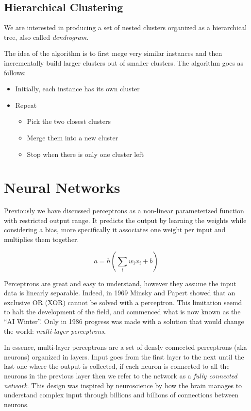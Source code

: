 \documentclass{article}
\begin{document}
\subsection{Hierarchical Clustering}\label{hierarchical-clustering}

We are interested in producing a set of nested clusters organized as a
hierarchical tree, also called \emph{dendrogram}.

The idea of the algorithm is to first mege very similar instances and
then incrementally build larger clusters out of smaller clusters. The
algorithm goes as follows:

\begin{itemize}
\tightlist
\item
  Initially, each instance has its own cluster
\item
  Repeat

  \begin{itemize}
  \tightlist
  \item
    Pick the two closest clusters
  \item
    Merge them into a new cluster
  \item
    Stop when there is only one cluster left
  \end{itemize}
\end{itemize}

\section{Neural Networks}\label{neural-networks}

Previously we have discussed perceptrons as a non-linear parameterized
function with restricted output range. It predicts the output by
learning the weights while considering a bias, more specifically it
associates one weight per input and multiplies them together.

\[a=h(\sum_i w_ix_i+b)\]

Perceptrons are great and easy to understand, however they assume the
input data is linearly separable. Indeed, in 1969 Minsky and Papert
showed that an exclusive OR (XOR) cannot be solved with a perceptron.
This limitation seemd to halt the development of the field, and
commenced what is now known as the ``AI Winter''. Only in 1986 progress
was made with a solution that would change the world: \emph{multi-layer
perceptrons}.

In essence, multi-layer perceptrons are a set of densly connected
perceptrons (aka neurons) organized in layers. Input goes from the first
layer to the next until the last one where the output is collected, if
each neuron is connected to all the neurons in the previous layer then
we refer to the network as a \emph{fully connected network}. This design
was inspired by neuroscience by how the brain manages to understand
complex input through billions and billions of connections between
neurons.
\end{document}
